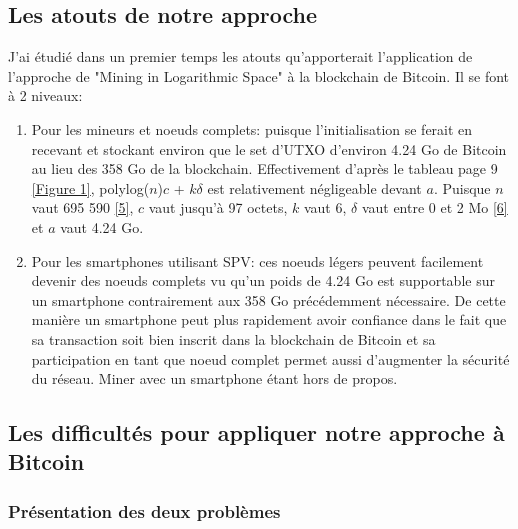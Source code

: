 \documentclass[12pt,a4paper]{article}
\newcommand{\source}[1]{\hyperlink{#1}{[#1]}}
\newcommand{\annexe}[2]{\hyperlink{#1}{[Figure #2]}}
\begin{document}
	\subsection{Les atouts de notre approche}
	
	J'ai étudié dans un premier temps les atouts qu'apporterait l'application de l'approche de "Mining in Logarithmic Space" à la blockchain de Bitcoin. Il se font à 2 niveaux:\\
	\begin{enumerate}
	\item Pour les mineurs et noeuds complets: puisque l'initialisation se ferait en recevant et stockant environ que le set d'UTXO d'environ 4.24 Go de Bitcoin au lieu des 358 Go de la blockchain. Effectivement d'après le tableau page 9 \annexe{21}{1}, polylog($n$)$c$ + $k\delta$ est relativement négligeable devant $a$. Puisque $n$ vaut 695 590 \source{5}, $c$ vaut jusqu'à 97 octets, $k$ vaut 6, $\delta$ vaut entre 0 et 2 Mo \source{6} et $a$ vaut 4.24 Go. %
	
	\item Pour les smartphones utilisant SPV: ces noeuds légers peuvent facilement devenir des noeuds complets vu qu'un poids de 4.24 Go est supportable sur un smartphone contrairement aux 358 Go précédemment nécessaire. De cette manière un smartphone peut plus rapidement avoir confiance dans le fait que sa transaction soit bien inscrit dans la blockchain de Bitcoin et sa participation en tant que noeud complet permet aussi d'augmenter la sécurité du réseau. %
	Miner avec un smartphone étant hors de propos.
	\end{enumerate}
	
	\subsection{Les difficultés pour appliquer notre approche à Bitcoin}
	
	\subsubsection{Présentation des deux problèmes}
	
\end{document}
